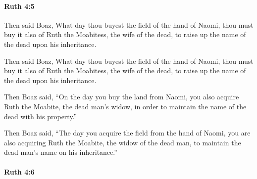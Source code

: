 		\paragraph{Ruth 4:5} %
			\label{RUTH-4-5}

			Then said Boaz, What day thou buyest the field of the hand of Naomi, thou must buy it also of Ruth the Moabitess, the wife of the dead, to raise up the name of the dead upon his inheritance.

			\begin{versebox}
					\item[BHS] 
					\item[LXX] 
					\item[ASV] Then said Boaz, What day thou buyest the field of the hand of Naomi, thou must buy it also of Ruth the Moabitess, the wife of the dead, to raise up the name of the dead upon his inheritance.
					\item[NIV] Then Boaz said, “On the day you buy the land from Naomi, you also acquire Ruth the Moabite, the dead man’s widow, in order to maintain the name of the dead with his property.”
					\item[NRSV] Then Boaz said, “The day you acquire the field from the hand of Naomi, you are also acquiring Ruth the Moabite, the widow of the dead man, to maintain the dead man’s name on his inheritance.”
			\end{versebox}

		\paragraph{Ruth 4:6} %
			\label{RUTH-4-6}

